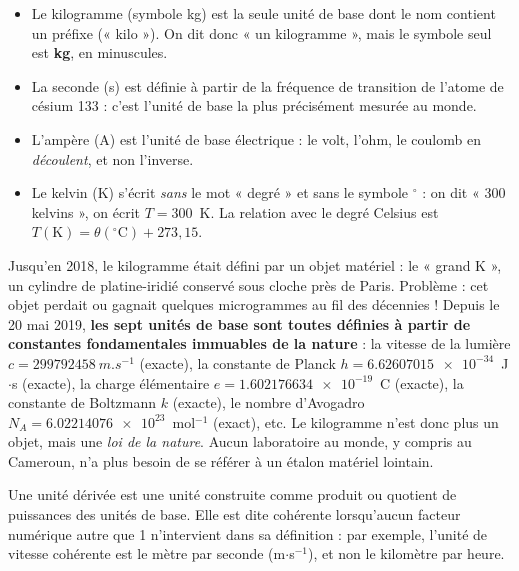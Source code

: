 \documentclass[11pt]{article}
\newcommand{\cle}[1]{{\popxbold\color{popdark}#1}}
\newcounter{popsec}
\newcounter{popsub}
\newcommand{\courssub}[1]{%
  \stepcounter{popsub}%
  \par\vspace{9pt}\noindent{\popxbold\fontsize{11.5}{13}\selectfont\color{popink}{\color{poporange}\thepopsec.\thepopsub}\hspace{6pt}#1}\par\nopagebreak\vspace{4pt}
}
\begin{document}
\begin{itemize}
\item Le \cle{kilogramme} (symbole kg) est la seule unité de base dont le nom contient un préfixe (« kilo »). On dit donc « un kilogramme », mais le symbole seul est \textbf{kg}, en minuscules.
\item La \cle{seconde} (s) est définie à partir de la fréquence de transition de l'atome de césium 133 : c'est l'unité de base la plus précisément mesurée au monde.
\item L'\cle{ampère} (A) est l'unité de base électrique : le volt, l'ohm, le coulomb en \emph{découlent}, et non l'inverse.
\item Le \cle{kelvin} (K) s'écrit \emph{sans} le mot « degré » et sans le symbole ${}^\circ$ : on dit « 300 kelvins », on écrit $T = 300$~K. La relation avec le degré Celsius est $T(\mathrm{K}) = \theta({}^\circ\mathrm{C}) + 273{,}15$.
\end{itemize}

\begin{savaistu}
Jusqu'en 2018, le kilogramme était défini par un objet matériel : le « grand K », un cylindre de platine-iridié conservé sous cloche près de Paris. Problème : cet objet perdait ou gagnait quelques microgrammes au fil des décennies ! Depuis le 20 mai 2019, \textbf{les sept unités de base sont toutes définies à partir de constantes fondamentales immuables de la nature} : la vitesse de la lumière $c = \SI{299792458}{m.s^{-1}}$ (exacte), la constante de Planck $h = \num{6,62607015e-34}$~J$\cdot$s (exacte), la charge élémentaire $e = \num{1,602176634e-19}$~C (exacte), la constante de Boltzmann $k$ (exacte), le nombre d'Avogadro $N_A = \num{6,02214076e23}$~mol$^{-1}$ (exact), etc. Le kilogramme n'est donc plus un objet, mais une \emph{loi de la nature}. Aucun laboratoire au monde, y compris au Cameroun, n'a plus besoin de se référer à un étalon matériel lointain.
\end{savaistu}

\courssub{Les unités dérivées}

\begin{definition}
Une \cle{unité dérivée} est une unité construite comme produit ou quotient de puissances des unités de base. Elle est dite \cle{cohérente} lorsqu'aucun facteur numérique autre que 1 n'intervient dans sa définition : par exemple, l'unité de vitesse cohérente est le mètre par seconde (m$\cdot$s$^{-1}$), et non le kilomètre par heure.
\end{definition}
\end{document}
